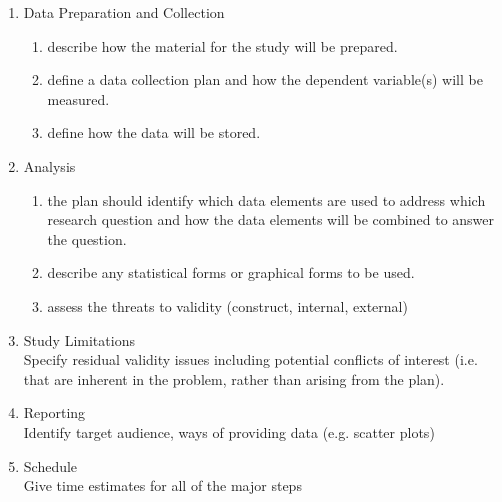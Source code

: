 \begin{anexosenv}
\begin{enumerate}
\begin{enumerate}
	\end{enumerate}
\item Data Preparation and Collection
	\begin{enumerate}
	\item describe how the material for the study will be prepared.
	\item define a data collection plan and how the dependent variable(s) will be measured.
	\item define how the data will be stored.
	\end{enumerate}
\item Analysis
	\begin{enumerate}
	\item the plan should identify which data elements are used to address which research question and how the data elements will be combined to answer the question.
	\item describe any statistical forms or graphical forms to be used.
	\item assess the threats to validity (construct, internal, external)	
	\end{enumerate}
\item Study Limitations \\
Specify residual validity issues including potential conflicts of interest (i.e. that are inherent in the problem, rather than arising from the plan).

\item Reporting \\
Identify target audience, ways of providing data (e.g. scatter plots)

\item Schedule \\
Give time estimates for all of the major steps
\end{enumerate}

\end{anexosenv}

